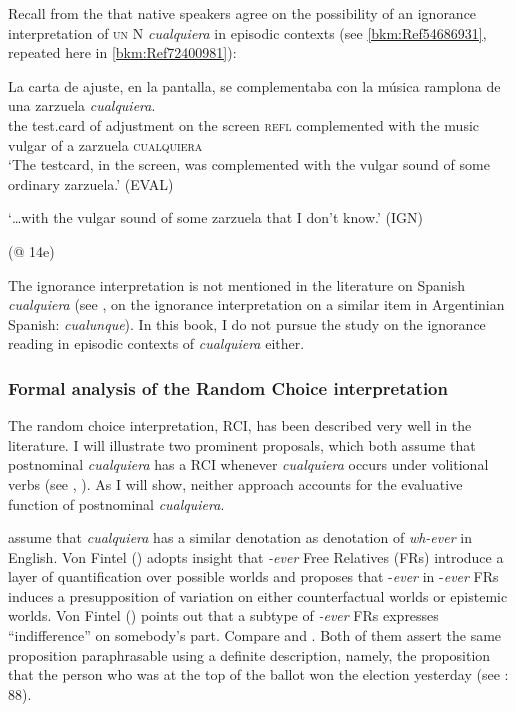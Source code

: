 Recall from the  that native speakers agree on the possibility of an ignorance interpretation of \textsc{un} N \textit{cualquiera} in episodic contexts (see \ref{bkm:Ref54686931}, repeated here in \ref{bkm:Ref72400981}):

\ea %
\label{bkm:Ref72400981} 
\gll La carta de ajuste, en la pantalla, se complementaba con la música ramplona de una zarzuela \textit{cualquiera}.\\
the test.card of adjustment on the screen \textsc{refl} complemented with the music vulgar of a zarzuela \textsc{cualquiera}\\
\ea ‘The testcard, in the screen, was complemented with the vulgar sound of some ordinary zarzuela.’   (EVAL)

\ex ‘…with the vulgar sound of some zarzuela that I don’t know.’ (IGN)

  (@ 14e)
\z
\z

The ignorance interpretation is not mentioned in the literature on Spanish \textit{cualquiera} (see \citealt{Kellert-francia-2023}, on the ignorance interpretation on a similar item in Argentinian Spanish: \textit{cualunque}). In this book, I do not pursue the study on the ignorance reading in episodic contexts of \textit{cualquiera} either.

\subsubsection{{Formal analysis of the Random Choice interpretation}} \label{sec:2.2.3.2}

The random choice interpretation, RCI, has been described very well in the literature. I will illustrate two prominent proposals, which both assume that postnominal \textit{cualquiera} has a RCI whenever \textit{cualquiera} occurs under volitional verbs (see \citealt{ChoiRomero2008}, \citealt{am2018}). As I will show, neither approach accounts for the evaluative function of postnominal \textit{cualquiera}.

\citet{ChoiRomero2008} assume that \textit{cualquiera} has a similar denotation as  denotation of \textit{wh-ever} in English. Von Fintel (\citeyear*{Fintel2000}) adopts  insight that \textit{-ever} Free Relatives (FRs) introduce a layer of quantification over possible worlds and proposes that -\textit{ever} in -\textit{ever} FRs induces a presupposition of variation on either counterfactual worlds or epistemic worlds. Von Fintel (\citeyear*{Fintel2000}) points out that a subtype of \textit{-ever} FRs expresses “indifference” on somebody’s part. Compare  and . Both of them assert the same proposition paraphrasable using a definite description, namely, the proposition that the person who was at the top of the ballot won the election yesterday (see \citealt{ChoiRomero2008}: 88).

